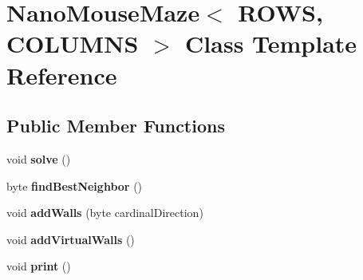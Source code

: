 \hypertarget{class_nano_mouse_maze}{}\section{Nano\+Mouse\+Maze$<$ R\+O\+W\+S, C\+O\+L\+U\+M\+N\+S $>$ Class Template Reference}
\label{class_nano_mouse_maze}
\subsection*{Public Member Functions}
\begin{DoxyCompactItemize}
\item 
\hypertarget{class_nano_mouse_maze_a1c65449292ab1c6a35f55777a234e082}{}void {\bfseries solve} ()\label{class_nano_mouse_maze_a1c65449292ab1c6a35f55777a234e082}

\item 
\hypertarget{class_nano_mouse_maze_ae1539b0994344375e28c78ce91affd6b}{}byte {\bfseries find\+Best\+Neighbor} ()\label{class_nano_mouse_maze_ae1539b0994344375e28c78ce91affd6b}

\item 
\hypertarget{class_nano_mouse_maze_a2dd2d4b300536628e2109811ec368081}{}void {\bfseries add\+Walls} (byte cardinal\+Direction)\label{class_nano_mouse_maze_a2dd2d4b300536628e2109811ec368081}

\item 
\hypertarget{class_nano_mouse_maze_a6469e436a0e7b0111d24307482c9f235}{}void {\bfseries add\+Virtual\+Walls} ()\label{class_nano_mouse_maze_a6469e436a0e7b0111d24307482c9f235}

\item 
\hypertarget{class_nano_mouse_maze_aaf686a0e04f831c6e4f5f3cfb220618f}{}void {\bfseries print} ()\label{class_nano_mouse_maze_aaf686a0e04f831c6e4f5f3cfb220618f}

\end{DoxyCompactItemize}

